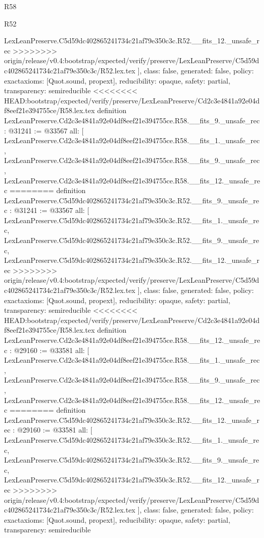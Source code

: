 \begin{lexlean}{R58}
\begin{lexlean}{R52}
\begin{coremodule}
{{{{{{{{{{{{{{{{{{{{{{{{{{{{{{{{{{{{{{{{{{{{{{{{{{{{{{{{{{{{{{{{{{{{{{{{{{{{{{{{{{{{{{{{{{{{{{{{{{{{{{{{{{{{{{{{{{{{{{{{{{{{{{{{{{{{{{{{{{{{{{{{{{{{{{{{{{{{    LexLeanPreserve.C5d59dc402865241734c21af79e350c3c.R52.__fits_12._unsafe_rec
>>>>>>>> origin/release/v0.4:bootstrap/expected/verify/preserve/LexLeanPreserve/C5d59dc402865241734c21af79e350c3c/R52.lex.tex
  ],
  class: false,
  generated: false,
  policy: exact{axioms: [Quot.sound, propext]},
  reducibility: opaque{},
  safety: partial,
  transparency: semireducible
}
<<<<<<<< HEAD:bootstrap/expected/verify/preserve/LexLeanPreserve/Cd2c3e4841a92e04df8eef21e394755ce/R58.lex.tex
definition LexLeanPreserve.Cd2c3e4841a92e04df8eef21e394755ce.R58.__fits_9._unsafe_rec : @31241 := @33567 {
  all: [
    LexLeanPreserve.Cd2c3e4841a92e04df8eef21e394755ce.R58.__fits_1._unsafe_rec,
    LexLeanPreserve.Cd2c3e4841a92e04df8eef21e394755ce.R58.__fits_9._unsafe_rec,
    LexLeanPreserve.Cd2c3e4841a92e04df8eef21e394755ce.R58.__fits_12._unsafe_rec
========
definition LexLeanPreserve.C5d59dc402865241734c21af79e350c3c.R52.__fits_9._unsafe_rec : @31241 := @33567 {
  all: [
    LexLeanPreserve.C5d59dc402865241734c21af79e350c3c.R52.__fits_1._unsafe_rec,
    LexLeanPreserve.C5d59dc402865241734c21af79e350c3c.R52.__fits_9._unsafe_rec,
    LexLeanPreserve.C5d59dc402865241734c21af79e350c3c.R52.__fits_12._unsafe_rec
>>>>>>>> origin/release/v0.4:bootstrap/expected/verify/preserve/LexLeanPreserve/C5d59dc402865241734c21af79e350c3c/R52.lex.tex
  ],
  class: false,
  generated: false,
  policy: exact{axioms: [Quot.sound, propext]},
  reducibility: opaque{},
  safety: partial,
  transparency: semireducible
}
<<<<<<<< HEAD:bootstrap/expected/verify/preserve/LexLeanPreserve/Cd2c3e4841a92e04df8eef21e394755ce/R58.lex.tex
definition LexLeanPreserve.Cd2c3e4841a92e04df8eef21e394755ce.R58.__fits_12._unsafe_rec : @29160 := @33581 {
  all: [
    LexLeanPreserve.Cd2c3e4841a92e04df8eef21e394755ce.R58.__fits_1._unsafe_rec,
    LexLeanPreserve.Cd2c3e4841a92e04df8eef21e394755ce.R58.__fits_9._unsafe_rec,
    LexLeanPreserve.Cd2c3e4841a92e04df8eef21e394755ce.R58.__fits_12._unsafe_rec
========
definition LexLeanPreserve.C5d59dc402865241734c21af79e350c3c.R52.__fits_12._unsafe_rec : @29160 := @33581 {
  all: [
    LexLeanPreserve.C5d59dc402865241734c21af79e350c3c.R52.__fits_1._unsafe_rec,
    LexLeanPreserve.C5d59dc402865241734c21af79e350c3c.R52.__fits_9._unsafe_rec,
    LexLeanPreserve.C5d59dc402865241734c21af79e350c3c.R52.__fits_12._unsafe_rec
>>>>>>>> origin/release/v0.4:bootstrap/expected/verify/preserve/LexLeanPreserve/C5d59dc402865241734c21af79e350c3c/R52.lex.tex
  ],
  class: false,
  generated: false,
  policy: exact{axioms: [Quot.sound, propext]},
  reducibility: opaque{},
  safety: partial,
  transparency: semireducible
}}}}}}}}}}}}}}}}}}}}}}}}}}}}}}}}}}}}}}}}}}}}}}}}}}}}}}}}}}}}}}}}}}}}}}}}}}}}}}}}}}}}}}}}}}}}}}}}}}}}}}}}}}}}}}}}}}}}}}}}}}}}}}}}}}}}}}}}}}}}}}}}}}}}}}}}}}}}}}
\end{coremodule}
\end{lexlean}
\end{lexlean}
